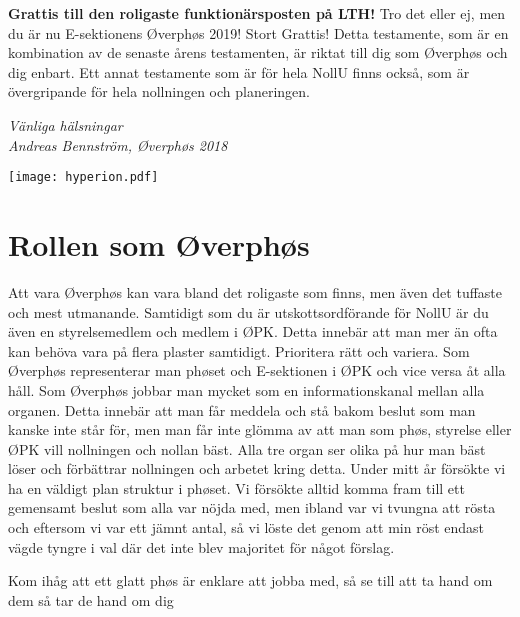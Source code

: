 \documentclass[10pt]{article}
\def\docauthor{Andreas Bennström}
\begin{document}
    \heading{\doctitle}

    \textbf{Grattis till den roligaste funktionärsposten på LTH!}\newline
    Tro det eller ej, men du är nu E-sektionens Øverphøs 2019! Stort Grattis! Detta testamente, som är en kombination av de senaste årens testamenten, är riktat till dig som Øverphøs och dig enbart. Ett annat testamente som är för hela NollU finns också, som är övergripande för hela nollningen och planeringen.

    \emph{Vänliga hälsningar}\\
    \emph{{\docauthor}, Øverphøs 2018}

    \begin{center}
    \texttt{[image: hyperion.pdf]}    
    \end{center}

    \newpage

    \tableofcontents
    
    \newpage

    \section{Rollen som Øverphøs}
    Att vara Øverphøs kan vara bland det roligaste som finns, men även det tuffaste och mest utmanande. Samtidigt som du är utskottsordförande för NollU är du även en styrelsemedlem och medlem i ØPK. Detta innebär att man mer än ofta kan behöva vara på flera plaster samtidigt. Prioritera rätt och variera. Som Øverphøs representerar man phøset och E-sektionen i ØPK och vice versa åt alla håll. Som Øverphøs jobbar man mycket som en informationskanal mellan alla organen. Detta innebär att man får meddela och stå bakom beslut som man kanske inte står för, men man får inte glömma av att man som phøs, styrelse eller ØPK vill nollningen och nollan bäst. Alla tre organ ser olika på hur man bäst löser och förbättrar nollningen och arbetet kring detta. Under mitt år försökte vi ha en väldigt plan struktur i phøset. Vi försökte alltid komma fram till ett gemensamt beslut som alla var nöjda med, men ibland var vi tvungna att rösta och eftersom vi var ett jämnt antal, så vi löste det genom att min röst endast vägde tyngre i val där det inte blev majoritet för något förslag.

    Kom ihåg att ett glatt phøs är enklare att jobba med, så se till att ta hand om dem så tar de hand om dig
\end{document}
